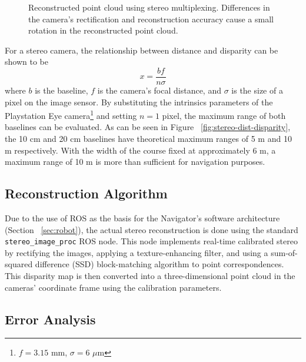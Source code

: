 \documentclass[11pt,twocolumn]{article}
\begin{document}
\begin{figure*}
	\centering
	\caption{
		Reconstructed point cloud using stereo multiplexing. Differences in the
		camera's rectification and reconstruction accuracy cause a small
		rotation in the reconstructed point cloud.
	}
\end{figure*}

For a stereo camera, the relationship between distance and disparity can be
shown to be
\begin{equation*}
	x = \frac{bf}{n\sigma}
\end{equation*}
where $b$ is the baseline, $f$ is the camera's focal distance, and $\sigma$ is
the size of a pixel on the image sensor. By substituting the intrinsics
parameters of the Playstation Eye camera\footnote{$f = 3.15$ mm, $\sigma = 6$
$\mu$m} and setting $n = 1$ pixel, the maximum range of both baselines can be
evaluated. As can be seen in Figure ~\ref{fig:stereo-dist-disparity}, the 10 cm
and 20 cm baselines have theoretical maximum ranges of 5 m and 10 m
respectively. With the width of the course fixed at approximately 6 m, a
maximum range of 10 m is more than sufficient for navigation purposes.

\subsection{Reconstruction Algorithm}
\label{sec:stereo-correspond}
Due to the use of ROS as the basis for the Navigator's software architecture
(Section ~\ref{sec:robot}), the actual stereo reconstruction is done using the
standard \texttt{stereo\_image\_proc} ROS node. This node implements real-time
calibrated stereo by rectifying the images, applying a texture-enhancing
filter, and using a sum-of-squared difference (SSD) block-matching algorithm to
point correspondences. This disparity map is then converted into a
three-dimensional point cloud in the cameras' coordinate frame using the
calibration parameters.

\subsection{Error Analysis}
\end{document}

